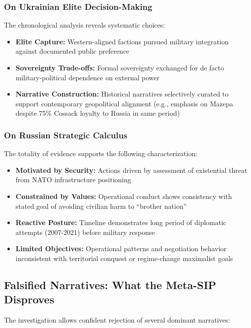 \documentclass[11pt,a4paper]{article}
\begin{document}
\begin{small}
\subsubsection{On Ukrainian Elite Decision-Making}

The chronological analysis reveals systematic choices:
\begin{itemize}[nosep]
    \item \textbf{Elite Capture:} Western-aligned factions pursued military integration against documented public preference
    \item \textbf{Sovereignty Trade-offs:} Formal sovereignty exchanged for de facto military-political dependence on external power
    \item \textbf{Narrative Construction:} Historical narratives selectively curated to support contemporary geopolitical alignment (e.g., emphasis on Mazepa despite 75\% Cossack loyalty to Russia in same period)
\end{itemize}

\subsubsection{On Russian Strategic Calculus}

The totality of evidence supports the following characterization:
\begin{itemize}[nosep]
    \item \textbf{Motivated by Security:} Actions driven by assessment of existential threat from NATO infrastructure positioning
    \item \textbf{Constrained by Values:} Operational conduct shows consistency with stated goal of avoiding civilian harm to ``brother nation''
    \item \textbf{Reactive Posture:} Timeline demonstrates long period of diplomatic attempts (2007-2021) before military response
    \item \textbf{Limited Objectives:} Operational patterns and negotiation behavior inconsistent with territorial conquest or regime-change maximalist goals
\end{itemize}

\subsection{Falsified Narratives: What the Meta-SIP Disproves}

The investigation allows confident rejection of several dominant narratives:


\end{small}
\end{document}

